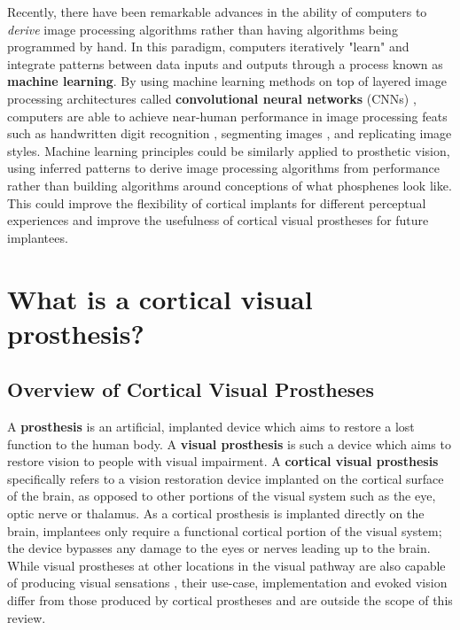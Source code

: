 \documentclass[a4paper,11pt,openany]{book}
\begin{document}
Recently, there have been remarkable advances in the ability of computers to \emph{derive} image processing algorithms rather than having algorithms being programmed by hand.
In this paradigm, computers iteratively "learn" and integrate patterns between data inputs and outputs through a process known as \textbf{machine learning}.  \cite{guo_deep_2016}
By using machine learning methods on top of layered image processing architectures called \textbf{convolutional neural networks} (CNNs) , computers are able to achieve near-human performance in image processing feats such as handwritten digit recognition \cite{ciresan_multi-column_2012}, segmenting images \cite{ciresan_deep_2012}, and replicating image styles. \cite{gatys_image_2016}
Machine learning principles could be similarly applied to prosthetic vision, using inferred patterns to derive image processing algorithms from performance rather than building algorithms around conceptions of what phosphenes look like.
This could improve the flexibility of cortical implants for different perceptual experiences and improve the usefulness of cortical visual prostheses for future implantees.


\clearpage

\chapter{What is a cortical visual prosthesis?}
\label{sec:orgfc938dd}
\label{org312a1bd}

\section*{Overview of Cortical Visual Prostheses}
\label{sec:org0217c50}

A \textbf{prosthesis} is an artificial, implanted device which aims to restore a lost function to the human body. \cite{thurston_pare_2007}
A \textbf{visual prosthesis} is such a device which aims to restore vision to people with visual impairment. \cite{weiland_visual_2008,ong_bionic_2012}
A \textbf{cortical visual prosthesis} specifically refers to a vision restoration device implanted on the cortical surface of the brain, as opposed to other portions of the visual system such as the eye, optic nerve or thalamus. \cite{lewis_restoration_2015}
As a cortical prosthesis is implanted directly on the brain, implantees only require a functional cortical portion of the visual system; the device bypasses any damage to the eyes or nerves leading up to the brain.
While visual prostheses at other locations in the visual pathway are also capable of producing visual sensations \cite{humayun_visual_1996,stingl_interim_2017,veraart_visual_1998,panetsos_consistent_2011}, their use-case, implementation and evoked vision differ from those produced by cortical prostheses and are outside the scope of this review.
\end{document}
